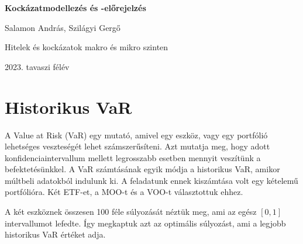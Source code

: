 \documentclass[12pt]{article}
\begin{document}
\begin{titlepage}
	\begin{center}
		\vspace*{5cm}
		
		\Huge
		\textbf{Kockázatmodellezés és -előrejelzés}
		
		\vspace{2cm}
		
		\LARGE
		Salamon András, Szilágyi Gergő
		
		\vfill
		
		\Large
		Hitelek és kockázatok makro és mikro szinten \\

        \vspace{1cm}
        
        2023. tavaszi félév
            
    \end{center}
\end{titlepage}


\tableofcontents

\clearpage

\listoffigures

\clearpage

\section{Historikus VaR}

A Value at Risk (VaR) egy mutató, amivel egy eszköz, vagy egy portfólió lehetséges veszteségét lehet számszerűsíteni. Azt mutatja meg, hogy adott konfidenciaintervallum mellett legrosszabb esetben mennyit veszítünk a befektetésünkkel. A VaR számtásának egyik módja a historikus VaR, amikor múltbeli adatokból indulunk ki. A feladatunk ennek kiszámtása volt egy kételemű portfólióra. Két ETF-et, a MOO-t és a VOO-t választottuk ehhez.

A két eszköznek összesen 100 féle súlyozását néztük meg, ami az egész $[0,1]$ intervallumot lefedte. Így megkaptuk azt az optimális súlyozást, ami a legjobb historikus VaR értéket adja.
\end{document}
